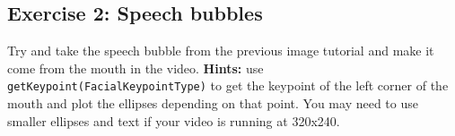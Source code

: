 \subsection*{Exercise 2: Speech bubbles}
Try and take the speech bubble from the previous image tutorial and make it come from the mouth 
in the video. \textbf{Hints:} use \verb+getKeypoint(FacialKeypointType)+ to get the keypoint 
of the left corner of the mouth and plot the ellipses depending on that point. You may need to 
use smaller ellipses and text if your video is running at 320x240.
